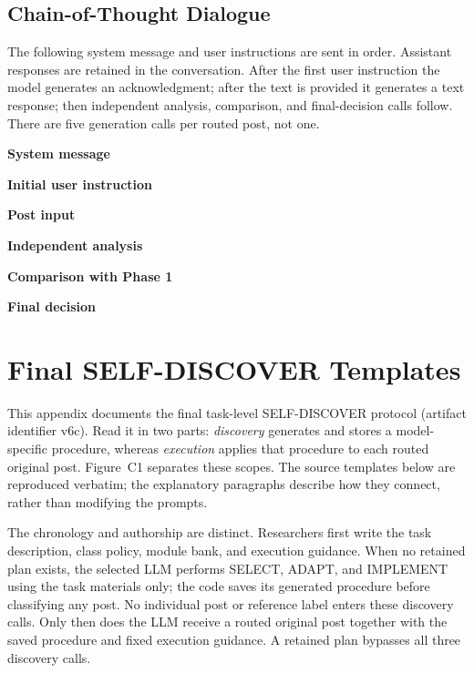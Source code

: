 \documentclass{ieeeaccess}
\begin{document}
\subsection{Chain-of-Thought Dialogue}
The following system message and user instructions are sent in order. Assistant responses are retained in the conversation. After the first user instruction the model generates an acknowledgment; after the text is provided it generates a text response; then independent analysis, comparison, and final-decision calls follow. There are five generation calls per routed post, not one.
\par\smallskip{}\noindent\textbf{System message}\par

\par\smallskip{}\noindent\textbf{Initial user instruction}\par

\par\smallskip{}\noindent\textbf{Post input}\par

\par\smallskip{}\noindent\textbf{Independent analysis}\par

\par\smallskip{}\noindent\textbf{Comparison with Phase 1}\par

\par\smallskip{}\noindent\textbf{Final decision}\par


\section{Final SELF-DISCOVER Templates}\label{app:sd-templates}
This appendix documents the final task-level SELF-DISCOVER protocol (artifact identifier v6c). Read it in two parts: \emph{discovery} generates and stores a model-specific procedure, whereas \emph{execution} applies that procedure to each routed original post. Figure~C1 separates these scopes. The source templates below are reproduced verbatim; the explanatory paragraphs describe how they connect, rather than modifying the prompts.

The chronology and authorship are distinct. Researchers first write the task description, class policy, module bank, and execution guidance. When no retained plan exists, the selected LLM performs SELECT, ADAPT, and IMPLEMENT using the task materials only; the code saves its generated procedure before classifying any post. No individual post or reference label enters these discovery calls. Only then does the LLM receive a routed original post together with the saved procedure and fixed execution guidance. A retained plan bypasses all three discovery calls.
\end{document}
